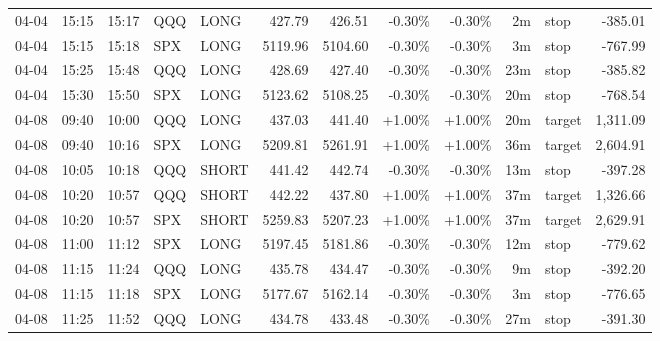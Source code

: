 \documentclass[11pt,a4paper]{article}
\begin{document}
\begin{center}
\begin{longtable}{>{\color{txtmain}}l l l l l r r r r r >{\color{txtmain}}l r}
04-04 & 15:15 & 15:17 & QQQ & LONG & 427.79 & 426.51 & \textcolor{lossred}{-0.30\%} & \textcolor{lossred}{-0.30\%} & 2m & stop & \textcolor{lossred}{-385.01} \\
04-04 & 15:15 & 15:18 & SPX & LONG & 5119.96 & 5104.60 & \textcolor{lossred}{-0.30\%} & \textcolor{lossred}{-0.30\%} & 3m & stop & \textcolor{lossred}{-767.99} \\
04-04 & 15:25 & 15:48 & QQQ & LONG & 428.69 & 427.40 & \textcolor{lossred}{-0.30\%} & \textcolor{lossred}{-0.30\%} & 23m & stop & \textcolor{lossred}{-385.82} \\
04-04 & 15:30 & 15:50 & SPX & LONG & 5123.62 & 5108.25 & \textcolor{lossred}{-0.30\%} & \textcolor{lossred}{-0.30\%} & 20m & stop & \textcolor{lossred}{-768.54} \\
04-08 & 09:40 & 10:00 & QQQ & LONG & 437.03 & 441.40 & \textcolor{wingreen}{+1.00\%} & \textcolor{wingreen}{+1.00\%} & 20m & target & \textcolor{wingreen}{1,311.09} \\
04-08 & 09:40 & 10:16 & SPX & LONG & 5209.81 & 5261.91 & \textcolor{wingreen}{+1.00\%} & \textcolor{wingreen}{+1.00\%} & 36m & target & \textcolor{wingreen}{2,604.91} \\
04-08 & 10:05 & 10:18 & QQQ & SHORT & 441.42 & 442.74 & \textcolor{lossred}{-0.30\%} & \textcolor{lossred}{-0.30\%} & 13m & stop & \textcolor{lossred}{-397.28} \\
04-08 & 10:20 & 10:57 & QQQ & SHORT & 442.22 & 437.80 & \textcolor{wingreen}{+1.00\%} & \textcolor{wingreen}{+1.00\%} & 37m & target & \textcolor{wingreen}{1,326.66} \\
04-08 & 10:20 & 10:57 & SPX & SHORT & 5259.83 & 5207.23 & \textcolor{wingreen}{+1.00\%} & \textcolor{wingreen}{+1.00\%} & 37m & target & \textcolor{wingreen}{2,629.91} \\
04-08 & 11:00 & 11:12 & SPX & LONG & 5197.45 & 5181.86 & \textcolor{lossred}{-0.30\%} & \textcolor{lossred}{-0.30\%} & 12m & stop & \textcolor{lossred}{-779.62} \\
04-08 & 11:15 & 11:24 & QQQ & LONG & 435.78 & 434.47 & \textcolor{lossred}{-0.30\%} & \textcolor{lossred}{-0.30\%} & 9m & stop & \textcolor{lossred}{-392.20} \\
04-08 & 11:15 & 11:18 & SPX & LONG & 5177.67 & 5162.14 & \textcolor{lossred}{-0.30\%} & \textcolor{lossred}{-0.30\%} & 3m & stop & \textcolor{lossred}{-776.65} \\
04-08 & 11:25 & 11:52 & QQQ & LONG & 434.78 & 433.48 & \textcolor{lossred}{-0.30\%} & \textcolor{lossred}{-0.30\%} & 27m & stop & \textcolor{lossred}{-391.30} \\

\end{longtable}
\end{center}
\end{document}
